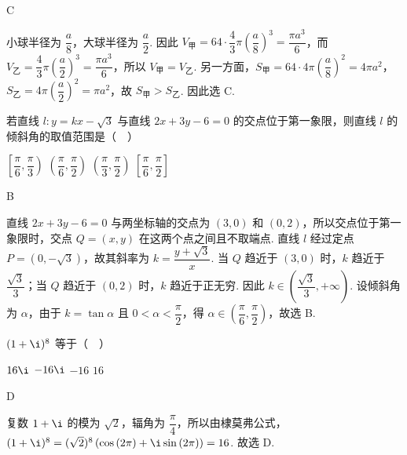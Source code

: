 \begin{answer}
C
\end{answer}

\begin{solution}
小球半径为 \(\dfrac{a}{8}\)，大球半径为 \(\dfrac{a}{2}\). 因此 \(V_{\text{甲}}=64\cdot\dfrac{4}{3}\pi\left(\dfrac{a}{8}\right)^3=\dfrac{\pi a^3}{6}\)，而 \(V_{\text{乙}}=\dfrac{4}{3}\pi\left(\dfrac{a}{2}\right)^3=\dfrac{\pi a^3}{6}\)，所以 \(V_{\text{甲}}=V_{\text{乙}}\).
另一方面，\(S_{\text{甲}}=64\cdot4\pi\left(\dfrac{a}{8}\right)^2=4\pi a^2\)，\(S_{\text{乙}}=4\pi\left(\dfrac{a}{2}\right)^2=\pi a^2\)，故 \(S_{\text{甲}}>S_{\text{乙}}\). 因此选 C.
\end{solution}

\begin{problem}
若直线 \(l:y=kx-\sqrt{3}\) 与直线 \(2x+3y-6=0\) 的交点位于第一象限，则直线 \(l\) 的倾斜角的取值范围是（\(\quad\)）

\choices
    {\(\left[\dfrac{\pi}{6},\dfrac{\pi}{3}\right)\)}
    {\(\left(\dfrac{\pi}{6},\dfrac{\pi}{2}\right)\)}
    {\(\left(\dfrac{\pi}{3},\dfrac{\pi}{2}\right)\)}
    {\(\left[\dfrac{\pi}{6},\dfrac{\pi}{2}\right]\)}
\end{problem}

\begin{answer}
B
\end{answer}

\begin{solution}
直线 \(2x+3y-6=0\) 与两坐标轴的交点为 \((3,0)\) 和 \((0,2)\)，所以交点位于第一象限时，交点 \(Q=(x,y)\) 在这两个点之间且不取端点. 直线 \(l\) 经过定点 \(P=(0,-\sqrt{3})\)，故其斜率为
\(k=\dfrac{y+\sqrt{3}}{x}\). 当 \(Q\) 趋近于 \((3,0)\) 时，\(k\) 趋近于 \(\dfrac{\sqrt{3}}{3}\)；当 \(Q\) 趋近于 \((0,2)\) 时，\(k\) 趋近于正无穷. 因此 \(k\in\left(\dfrac{\sqrt{3}}{3},+\infty\right)\). 设倾斜角为 \(\alpha\)，由于 \(k=\tan\alpha\) 且 \(0<\alpha<\dfrac{\pi}{2}\)，得 \(\alpha\in\left(\dfrac{\pi}{6},\dfrac{\pi}{2}\right)\)，故选 B.
\end{solution}

\begin{problem}
\((1+\i)^8\) 等于（\(\quad\)）

\choices
    {\(16\i\)}
    {\(-16\i\)}
    {\(-16\)}
    {\(16\)}
\end{problem}

\begin{answer}
D
\end{answer}

\begin{solution}
复数 \(1+\i\) 的模为 \(\sqrt{2}\)，辐角为 \(\dfrac{\pi}{4}\)，所以由棣莫弗公式，\((1+\i)^8=(\sqrt{2})^8\left(\cos\left(2\pi\right)+\i\sin\left(2\pi\right)\right)=16\). 故选 D.
\end{solution}

